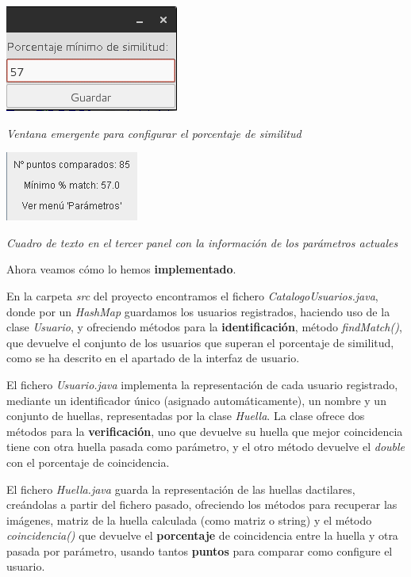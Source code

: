 \documentclass[]{article}
\begin{document}
\begin{center}
	\includegraphics[width=0.25\linewidth]{images/huellas/6.png}

	\textit{Ventana emergente para configurar el porcentaje de similitud}
\end{center}

\begin{center}
	\includegraphics[width=0.25\linewidth]{images/huellas/7.png}

	\textit{Cuadro de texto en el tercer panel con la información de los parámetros actuales}
\end{center}

\hfill

Ahora veamos cómo lo hemos \textbf{implementado}.
\hfill

En la carpeta \textit{src} del proyecto encontramos el fichero \textit{CatalogoUsuarios.java}, donde por un \textit{HashMap} guardamos los usuarios registrados, haciendo uso de la clase \textit{Usuario}, y ofreciendo métodos para la \textbf{identificación}, método \textit{findMatch()}, que devuelve el conjunto de los usuarios que superan el porcentaje de similitud, como se ha descrito en el apartado de la interfaz de usuario.

El fichero \textit{Usuario.java} implementa la representación de cada usuario registrado, mediante un identificador único (asignado automáticamente), un nombre y un conjunto de huellas, representadas por la clase \textit{Huella}. La clase ofrece dos métodos para la \textbf{verificación}, uno que devuelve su huella que mejor coincidencia tiene con otra huella pasada como parámetro, y el otro método devuelve el \textit{double} con el porcentaje de coincidencia.

El fichero \textit{Huella.java} guarda la representación de las huellas dactilares, creándolas a partir del fichero pasado, ofreciendo los métodos para recuperar las imágenes, matriz de la huella calculada (como matriz o string) y el método \textit{coincidencia()} que devuelve el \textbf{porcentaje} de coincidencia entre la huella y otra pasada por parámetro, usando tantos \textbf{puntos} para comparar como configure el usuario.
\end{document}
